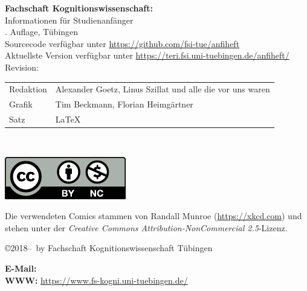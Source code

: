 \thispagestyle{empty}

\textbf{Fachschaft Kognitionswissenschaft:}\\
Informationen für Studienanfänger\\
\number\auflage. Auf\/lage, Tübingen \number\jahr\\[0.2cm]
{\footnotesize Sourcecode verfügbar unter \url{https://github.com/fsi-tue/anfiheft}\\
               Aktuellste Version verfügbar unter \url{https://teri.fsi.uni-tuebingen.de/anfiheft/}\\
	       Revision: \gitCommit\\[1cm]}


\begin{tabular}{ll}
	Redaktion & Alexander Goetz, Linus Szillat und alle die vor uns waren\\ %
	Grafik & Tim Beckmann, Florian Heimgärtner \\
	Satz & \LaTeX
\end{tabular}\\

\vfill
\begin{minipage}[c]{0.1\textwidth}
	\includegraphics[width=\linewidth]{kogni/logos/by-nc.pdf}
\end{minipage}
\begin{minipage}[c]{0.9\textwidth}
	Die verwendeten Comics stammen von Randall Munroe (\url{https://xkcd.com}) und stehen unter der \emph{Creative Commons Attribution-NonCommercial 2.5}-Lizenz.
\end{minipage}

\copyright 2018--\number\jahr~by Fachschaft Kognitionswissenschaft Tübingen\\

\medskip

\textbf{E-Mail:} \hfill
{}\\
\textbf{WWW:} \hfill
\url{https://www.fs-kogni.uni-tuebingen.de/}
\newpage
